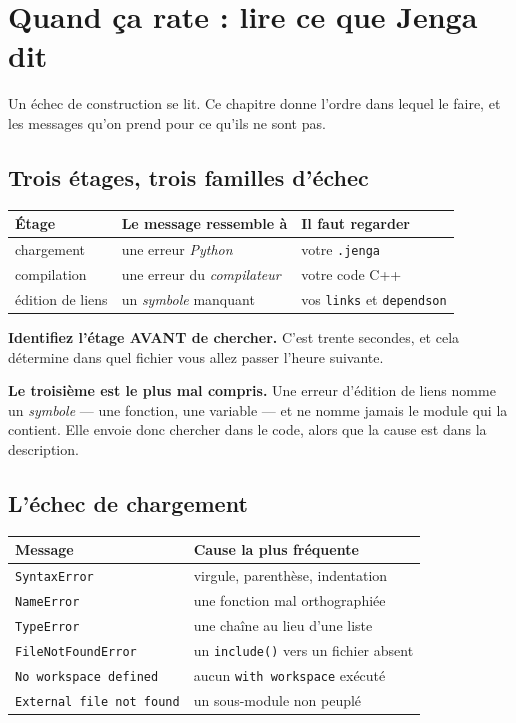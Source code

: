 \chapter{Quand ça rate : lire ce que Jenga dit}

Un échec de construction se lit. Ce chapitre donne l'ordre dans lequel le faire,
et les messages qu'on prend pour ce qu'ils ne sont pas.

\section{Trois étages, trois familles d'échec}

\begin{center}
\begin{tabular}{@{}lll@{}}
\toprule
\textbf{Étage} & \textbf{Le message ressemble à} & \textbf{Il faut regarder} \\
\midrule
chargement & une erreur \emph{Python} & votre \texttt{.jenga} \\
compilation & une erreur du \emph{compilateur} & votre code C++ \\
édition de liens & un \emph{symbole} manquant & vos \texttt{links} et \texttt{dependson} \\
\bottomrule
\end{tabular}
\end{center}

\begin{nkretenir}
\textbf{Identifiez l'étage AVANT de chercher.} C'est trente secondes, et cela
détermine dans quel fichier vous allez passer l'heure suivante.

\textbf{Le troisième est le plus mal compris.} Une erreur d'édition de liens
nomme un \emph{symbole} --- une fonction, une variable --- et ne nomme jamais le
module qui la contient. Elle envoie donc chercher dans le code, alors que la
cause est dans la description.
\end{nkretenir}

\section{L'échec de chargement}

\begin{center}
\begin{tabular}{@{}ll@{}}
\toprule
\textbf{Message} & \textbf{Cause la plus fréquente} \\
\midrule
\texttt{SyntaxError} & virgule, parenthèse, indentation \\
\texttt{NameError} & une fonction mal orthographiée \\
\texttt{TypeError} & une chaîne au lieu d'une liste \\
\texttt{FileNotFoundError} & un \texttt{include()} vers un fichier absent \\
\texttt{No workspace defined} & aucun \texttt{with workspace} exécuté \\
\texttt{External file not found} & un sous-module non peuplé \\
\bottomrule
\end{tabular}
\end{center}

